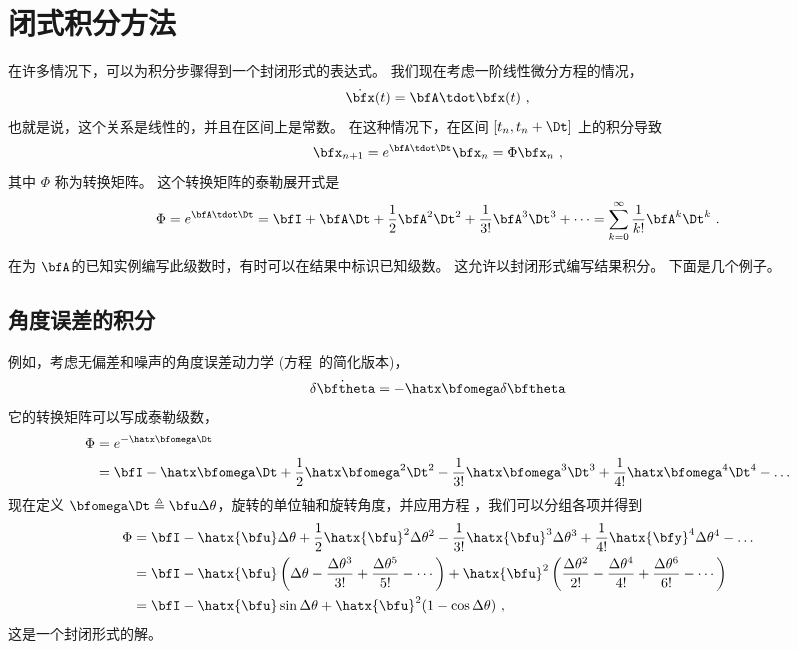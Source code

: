 
\section{闭式积分方法}
\label{sec:ClosedFormInt}

在许多情况下，可以为积分步骤得到一个封闭形式的表达式。 
我们现在考虑一阶线性微分方程的情况，
%
\begin{equation}
\dot\bfx(t)=\bfA\tdot\bfx(t)~,
\end{equation}
%
也就是说，这个关系是线性的，并且在区间上是常数。 
在这种情况下，在区间 $[t_n , t_n+\Dt]$ 上的积分导致
%
\begin{equation}
\bfx_{n+1}= e^{\bfA\tdot\Dt}\bfx_n = \Phi\bfx_n~,
\end{equation}
%
其中 $\Phi$ 称为转换矩阵。 
这个转换矩阵的泰勒展开式是
%
\begin{equation}
\Phi= e^{\bfA\tdot\Dt}=\bfI + \bfA\Dt + \frac{1}{2} \bfA^2\Dt^2 + \frac{1}{3!}\bfA^3\Dt^3 + \dots   = \sum_{k=0}^\infty \frac{1}{k!}\bfA^k\Dt^k ~.
\label{equ:TaylorExp}
\end{equation}


在为 $\bfA$的已知实例编写此级数时，有时可以在结果中标识已知级数。 
这允许以封闭形式编写结果积分。 
下面是几个例子。

\subsection{角度误差的积分}
\label{sec:ClosedFormAngle}

例如，考虑无偏差和噪声的角度误差动力学 (方程~的简化版本)，
%
\begin{equation}
\dot{\delta\bftheta} = -\hatx\bfomega\delta\bftheta 
\end{equation}
%
它的转换矩阵可以写成泰勒级数，
%
%
\begin{align}
\Phi &= e^{-\hatx\bfomega\Dt} \label{equ:phiexp}\\
&= \bfI -\hatx\bfomega\Dt + \frac12\hatx\bfomega^2\Dt^2 - \frac{1}{3!}\hatx\bfomega^3\Dt^3 + \frac{1}{4!}\hatx\bfomega^4\Dt^4 - \dots 
\end{align}%
%
现在定义 $\bfomega\Dt \triangleq \bfu \Delta\theta$，旋转的单位轴和旋转角度，并应用方程 ，我们可以分组各项并得到
%
%
\begin{align}
\Phi 
&= \bfI -\hatx{\bfu}\Delta\theta + \frac12\hatx{\bfu}^2\Delta\theta^2 - \frac{1}{3!}\hatx{\bfu}^3\Delta\theta^3 + \frac{1}{4!}\hatx{\bfy}^4\Delta\theta^4 - \dots \nonumber\\
&= \bfI - \hatx{\bfu}\left(\Delta\theta - \frac{\Delta\theta^3}{3!} + \frac{\Delta\theta^5}{5!} - \cdots\right) + \hatx{\bfu}^2\left(\frac{\Delta\theta^2}{2!} - \frac{\Delta\theta^4}{4!}  + \frac{\Delta\theta^6}{6!} - \cdots\right) \nonumber\\
&= \bfI - \hatx{\bfu}\sin\Delta\theta + \hatx{\bfu}^2(1-\cos\Delta\theta) ~,
\end{align}%
%
这是一个封闭形式的解。

